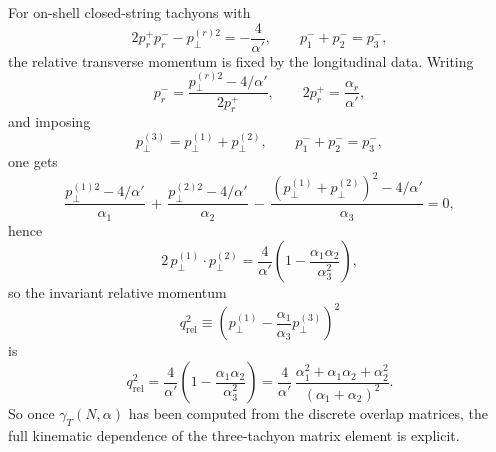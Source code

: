 \documentclass[11pt]{article}
\numberwithin{equation}{section}
\begin{document}
For on-shell closed-string tachyons with
\[
2p_r^+p_r^- - p_{\perp}^{(r)2} = -\frac{4}{\alpha'},
\qquad
p_1^-+p_2^-=p_3^-,
\]
the relative transverse momentum is fixed by the longitudinal data. Writing
\begin{equation}
\label{eq:s12-1-019}
p_r^-=\frac{p_\perp^{(r)2}-4/\alpha'}{2p_r^+},
\qquad
2p_r^+=\frac{\alpha_r}{\alpha'},
\end{equation}
and imposing
\begin{equation}
\label{eq:s12-1-020}
p_\perp^{(3)}=p_\perp^{(1)}+p_\perp^{(2)},
\qquad
p_1^-+p_2^-=p_3^-,
\end{equation}
one gets
\begin{equation}
\label{eq:s12-1-021}
\frac{p_\perp^{(1)2}-4/\alpha'}{\alpha_1}
\,+\,
\frac{p_\perp^{(2)2}-4/\alpha'}{\alpha_2}
\,-\,
\frac{(p_\perp^{(1)}+p_\perp^{(2)})^2-4/\alpha'}{\alpha_3}
=0,
\end{equation}
hence
\begin{equation}
\label{eq:s12-1-022}
2\,p_\perp^{(1)}\!\cdot p_\perp^{(2)}
=
\frac{4}{\alpha'}\left(
1-\frac{\alpha_1\alpha_2}{\alpha_3^2}
\right),
\end{equation}
so the invariant relative momentum
\begin{equation}
\label{eq:s12-1-023}
q_{\mathrm{rel}}^2
\equiv
\left(p_\perp^{(1)}-\frac{\alpha_1}{\alpha_3}p_\perp^{(3)}\right)^2
\end{equation}
is
\begin{equation}
\label{eq:s12-1-024}
q_{\mathrm{rel}}^2
=
\frac{4}{\alpha'}\left(
1-\frac{\alpha_1\alpha_2}{\alpha_3^2}
\right)
=
\frac{4}{\alpha'}\,
\frac{\alpha_1^2+\alpha_1\alpha_2+\alpha_2^2}{(\alpha_1+\alpha_2)^2}.
\end{equation}
So once $\gamma_T(N,\alpha)$ has been computed from the discrete overlap matrices, the full kinematic dependence of the three-tachyon matrix element is explicit.
\end{document}
